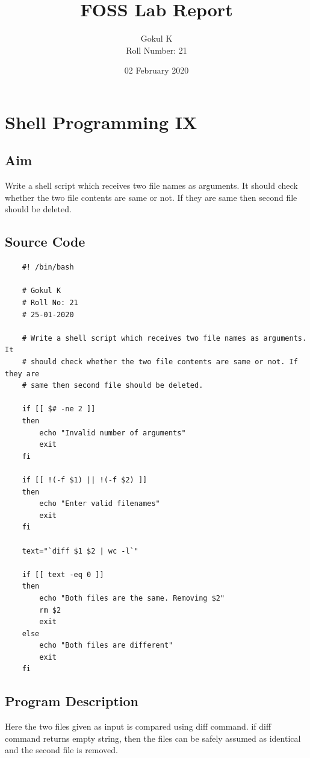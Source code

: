 \documentclass{article}
\begin{document}
\title{FOSS Lab Report}
\author{Gokul K\\[2\baselineskip]
Roll Number: 21\\[2\baselineskip]}
\date{02 February 2020}

\maketitle

\setcounter{section}{12}
\section{Shell Programming IX}
\subsection{Aim}
Write a shell script which receives two file names as arguments. It
should check whether the two file contents are same or not. If they are
same then second file should be deleted.


\subsection{Source Code}
\begin{verbatim}
    #! /bin/bash

    # Gokul K
    # Roll No: 21
    # 25-01-2020

    # Write a shell script which receives two file names as arguments. It
    # should check whether the two file contents are same or not. If they are
    # same then second file should be deleted.

    if [[ $# -ne 2 ]]
    then
        echo "Invalid number of arguments"
        exit
    fi

    if [[ !(-f $1) || !(-f $2) ]]
    then
        echo "Enter valid filenames"
        exit
    fi

    text="`diff $1 $2 | wc -l`"

    if [[ text -eq 0 ]]
    then
        echo "Both files are the same. Removing $2"
        rm $2
        exit
    else
        echo "Both files are different"
        exit
    fi
\end{verbatim}

\subsection{Program Description}
Here the two files given as input is compared using diff command. if
diff command returns empty string, then the files can be safely assumed
as identical and the second file is removed.
\end{document}
